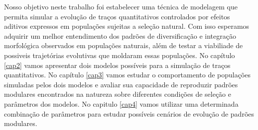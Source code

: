 Nosso objetivo neste trabalho foi estabelecer uma técnica de modelagem
que permita simular a evolução de traços quantitativos controlados
por efeitos aditivos expressos em populações sujeitas a seleção natural. 
Com isso esperamos adquirir um melhor entendimento dos padrões de
diversificação e integração morfológica observados em populações
naturais, além de testar a viabiliade de possiveis trajetórias
evolutivas que moldaram essas populações. 
No capítulo \ref{cap2} vamos apresentar dois modelos possíveis para a
simulação de traços quantitativos. 
No capítulo \ref{cap3} vamos estudar o comportamento de populações
simuladas pelos dois modelos e avaliar sua capacidade de reproduzir
padrões modulares encontrados na natureza sobre diferentes condições de
seleção e parâmetros dos modelos. 
No capitulo \ref{cap4} vamos utilizar uma determinada combinação de
parâmetros para estudar possíveis cenários de evolução de padrões
modulares. 
